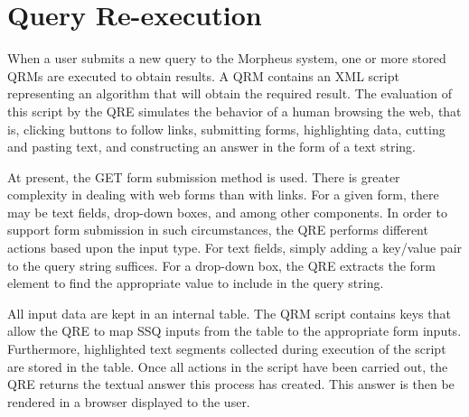 \section{Query Re-execution}
When a user submits a new query to the Morpheus system, one or more
stored QRMs are executed to obtain results. A QRM contains an XML script representing an algorithm that will obtain the required result.  The evaluation of this script by the QRE simulates the behavior of a human browsing the web, that is, clicking buttons to follow links, submitting forms, highlighting data, cutting and pasting text, and constructing an answer in the form of a text string.

At present, the GET form submission method is used.  There is greater
complexity in dealing with web forms than with links. For a given
form, there may be text fields, drop-down boxes, and among other components.
In order to support form submission in such circumstances, the QRE performs
different actions based upon the input type. For text fields, simply
adding a key/value pair to the query string suffices. For a drop-down
box, the QRE extracts the form element to find the appropriate value to
include in the query string.

All input data are kept in an internal table. The QRM script contains keys that allow the QRE to map SSQ inputs from the table to the appropriate form
inputs. Furthermore, highlighted text segments collected during
execution of the script are stored in the table.  Once all actions in
the script have been carried out, the QRE returns the textual answer this
process has created. This answer is then be rendered in a browser displayed to the user.

